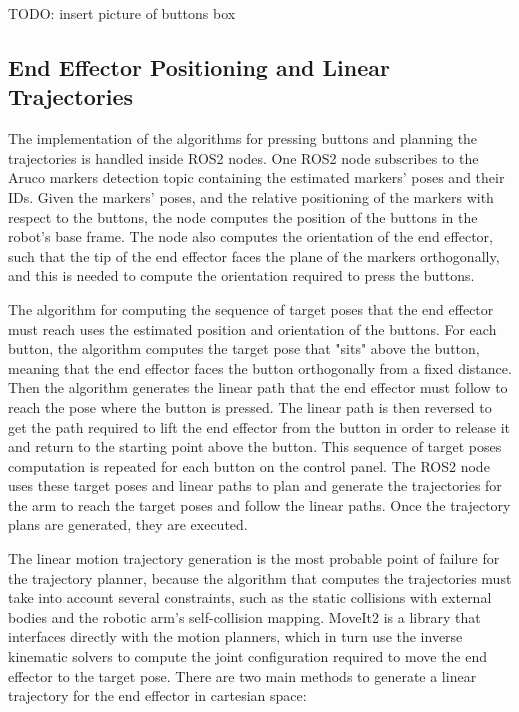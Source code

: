 TODO: insert picture of buttons box

\subsection{End Effector Positioning and Linear Trajectories}


The implementation of the algorithms for pressing buttons and planning the trajectories is handled inside
ROS2 nodes. One ROS2 node subscribes to the Aruco markers detection topic containing the estimated markers' poses 
and their IDs. Given the markers' poses, and the relative positioning of the markers with respect to the buttons,
the node computes the position of the buttons in the robot's base frame. The node also computes the orientation
of the end effector, such that the tip of the end effector faces the plane of the markers orthogonally, and this
is needed to compute the orientation required to press the buttons.

The algorithm for computing the sequence of target poses that the end effector must reach uses the estimated 
position and orientation of the buttons. For each button, the algorithm computes the target pose that 
"sits" above the button, meaning that the end effector faces the button orthogonally from a fixed distance.
Then the algorithm generates the linear path that the end effector must follow to reach the pose where 
the button is pressed. The linear path is then reversed to get the path required to lift the end effector 
from the button in order to release it and return to the starting point above the button. This sequence
of target poses computation is repeated for each button on the control panel. The ROS2 node uses these target 
poses and linear paths to plan and generate the trajectories for the arm to reach the target poses and 
follow the linear paths. Once the trajectory plans are generated, they are executed.

The linear motion trajectory generation is the most probable point of failure for the trajectory planner,
because the algorithm that computes the trajectories must take into account several constraints,
such as the static collisions with external bodies and the robotic arm's self-collision mapping.
MoveIt2 is a library that interfaces directly with the motion planners, which in turn use the inverse
kinematic solvers to compute the joint configuration required to move the end effector to the target pose.
There are two main methods to generate a linear trajectory for the end effector in cartesian space:

